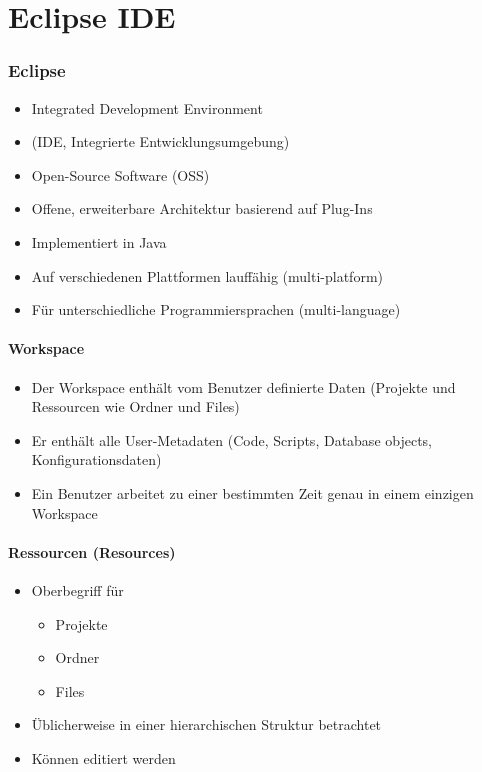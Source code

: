 
\part{Eclipse IDE}
\label{sec:Eclipse IDE}

\section{Eclipse}
\label{sec:Eclipse}
\begin{itemize}
	\item Integrated Development Environment
	\item[\-] (IDE, Integrierte Entwicklungsumgebung)
	\item Open-Source Software (OSS)
	\item Offene, erweiterbare Architektur basierend auf Plug-Ins
	\item Implementiert in Java
	\item Auf verschiedenen Plattformen lauffähig (multi-platform)
	\item Für unterschiedliche Programmiersprachen (multi-language)
\end{itemize}

\subsection{Workspace}
\label{sec:Workspace}
\begin{itemize}
	\item Der Workspace enthält vom Benutzer definierte Daten (Projekte und Ressourcen wie Ordner und Files)
	\item Er enthält alle User-Metadaten (Code, Scripts, Database objects, Konfigurationsdaten)
	\item Ein Benutzer arbeitet zu einer bestimmten Zeit genau in einem einzigen Workspace
\end{itemize}

\subsection{Ressourcen (Resources)}
\label{sec:Ressourcen (Resources)}
\begin{itemize}
	\item Oberbegriff für
	\begin{itemize}
		\item Projekte
		\item Ordner
		\item Files
	\end{itemize}
	\item Üblicherweise in einer hierarchischen Struktur betrachtet
	\item Können editiert werden
\end{itemize}

